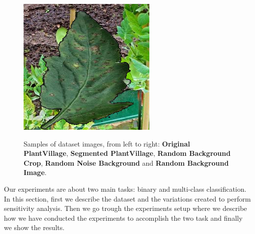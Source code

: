 \begin{figure}
\begin{center}
{			\includegraphics[scale=0.2241]{./images/random_backgorund}
		}
		\begin{center}
			\caption{Samples of dataset images, from left to right: \textbf{Original PlantVillage}, \textbf{Segmented PlantVillage}, \textbf{Random Background Crop}, \textbf{Random Noise Background} and \textbf{Random Background Image}.}
			\label{fig:samples}
		\end{center}
		\vspace{-32pt}
	\end{center}
\end{figure}
Our experiments are about two main tasks: binary and multi-class classification. In this section, first we describe the dataset and the variations created to perform sensitivity analysis. Then we go trough the experiments setup where we describe how we have conducted the experiments to accomplish the two task and finally we show the results.
